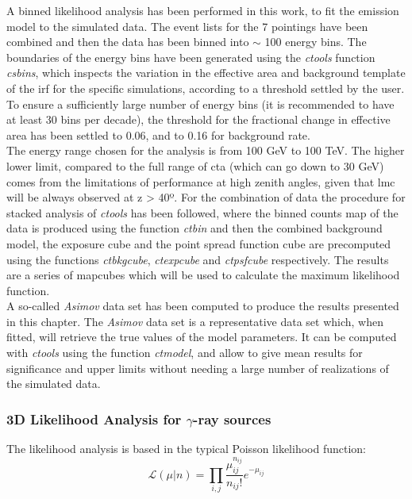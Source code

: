 \documentclass[main.tex]{subfiles}
\begin{document}
A binned likelihood analysis has been performed in this work, to fit the emission model to the simulated data. The event lists for the 7 pointings have been combined and then the data has been binned into $\sim$ 100 energy bins. The boundaries of the energy bins have been generated using the \textit{ctools} function \textit{csbins}, which inspects the variation in the effective area and background template of the \gls{irf} for the specific simulations, according to a threshold settled by the user. To ensure a sufficiently large number of energy bins (it is recommended to have at least 30 bins per decade), the threshold for the fractional change in effective area has been settled to 0.06, and to 0.16 for background rate. \\
The energy range chosen for the analysis is from 100 GeV to 100 TeV. The higher lower limit, compared to the full range of \gls{cta} (which can go down to 30 GeV) comes from the limitations of performance at high zenith angles, given that \gls{lmc} will be always observed at z > 40º.
For the combination of data the procedure for stacked analysis of \textit{ctools} has been followed, where the binned counts map of the data is produced using the function \textit{ctbin} and then the combined background model, the exposure cube and the point spread function cube are precomputed using the functions \textit{ctbkgcube}, \textit{ctexpcube} and \textit{ctpsfcube} respectively. The results are a series of mapcubes which will be used to calculate the maximum likelihood function.\\
A so-called \textit{Asimov} data set has been computed to produce the results presented in this chapter. The \textit{Asimov} data set \cite{2011Asimov} is a representative data set which, when fitted, will retrieve the true values of the model parameters. It can be computed with \textit{ctools} using the function \textit{ctmodel}, and allow to give mean results for significance and upper limits without needing a large number of realizations of the simulated data.

\subsubsection{3D Likelihood Analysis for $\gamma$-ray sources}

The likelihood analysis is based in the typical Poisson likelihood function:
\begin{equation}
  \mathcal{L}(\mu | n) = \prod_{i,j}\frac{\mu_{ij}^{n_{ij}}}{n_{ij}!}e^{-\mu_{ij}}
  \label{eq:likelihood}
\end{equation}
\end{document}
